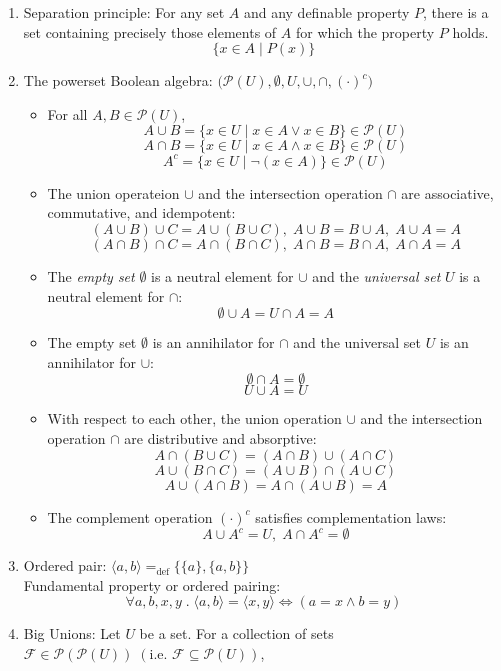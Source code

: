 \documentclass{article}
\begin{document}
\begin{enumerate}
    \item Separation principle: For any set $A$ and any definable property $P$, there is a set containing precisely those elements of $A$ for which the property $P$ holds.
        $$\{x\in A\;|\;P(x)\}$$
    \item The powerset Boolean algebra: $\big(\mathcal{P}(U), \emptyset, U, \cup, \cap, (\cdot)^c\big)$
        \begin{itemize}[topsep=0pt]
            \item For all $A, B\in\mathcal{P}(U)$,
                $$A\cup B=\{x\in U\;|\;x\in A\vee x\in B\}\in\mathcal{P}(U)$$
                $$A\cap B=\{x\in U\;|\;x\in A\wedge x\in B\}\in\mathcal{P}(U)$$
                $$A^c=\{x\in U\;|\;\neg(x\in A)\}\in\mathcal{P}(U)$$
            \item The union operateion $\cup$ and the intersection operation $\cap$ are associative, commutative, and idempotent:
                $$(A\cup B)\cup C=A\cup(B\cup C),\;A\cup B=B\cup A,\;A\cup A=A$$
                $$(A\cap B)\cap C=A\cap(B\cap C),\;A\cap B=B\cap A,\;A\cap A=A$$
            \item The \textit{empty set} $\emptyset$ is a neutral element for $\cup$ and the \textit{universal set} $U$ is a neutral element for $\cap$:
                $$\emptyset\cup A=U\cap A=A$$
            \item The empty set $\emptyset$ is an annihilator for $\cap$ and the universal set $U$ is an annihilator for $\cup$:
                $$\emptyset\cap A=\emptyset$$
                $$U\cup A=U$$
            \item With respect to each other, the union operation $\cup$ and the intersection operation $\cap$ are distributive and absorptive:
                $$A\cap(B\cup C)=(A\cap B)\cup(A\cap C)$$
                $$A\cup(B\cap C)=(A\cup B)\cap(A\cup C)$$
                $$A\cup(A\cap B)=A\cap(A\cup B)=A$$
            \item The complement operation $(\cdot)^c$ satisfies complementation laws:
                $$A\cup A^c=U,\;A\cap A^c=\emptyset$$
        \end{itemize}
    \item Ordered pair: $\langle a, b\rangle=_{\text{def}}\big\{\{a\},\{a, b\}\big\}$\\
    Fundamental property or ordered pairing: 
        $$\forall a,b,x,y\;.\;\langle a,b\rangle=\langle x,y\rangle\Longleftrightarrow(a=x\wedge b=y)$$
    \item Big Unions: Let $U$ be a set. For a collection of sets $\mathcal{F}\in\mathcal{P}(\mathcal{P}(U))\;(\text{i.e. }\mathcal{F}\subseteq\mathcal{P}(U))$, 

\end{enumerate}
\end{document}

